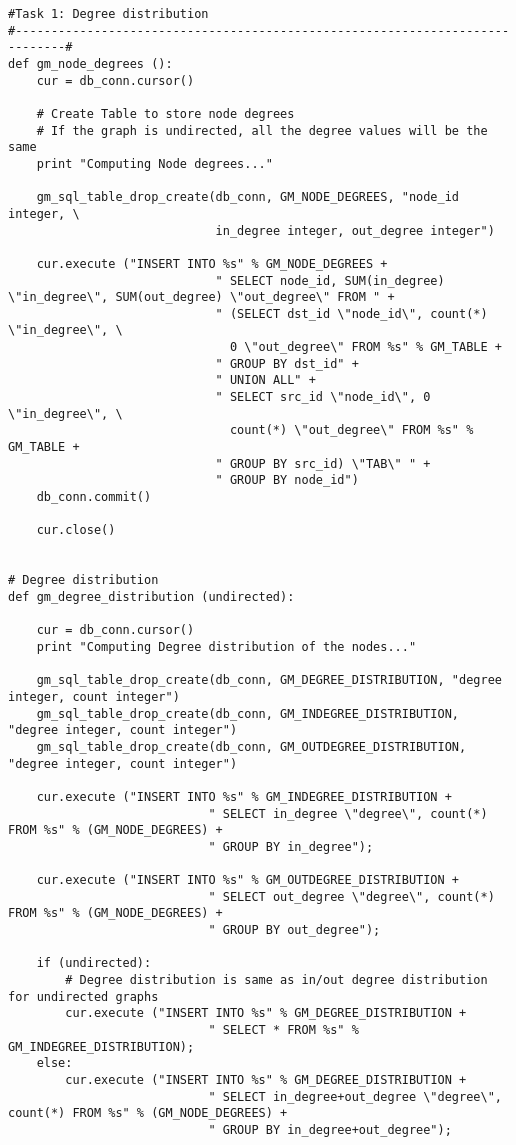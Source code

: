 \documentclass[11pt]{article}
\begin{document}
\begin{lstlisting}
#Task 1: Degree distribution
#-----------------------------------------------------------------------------#
def gm_node_degrees ():
    cur = db_conn.cursor()    
    
    # Create Table to store node degrees
    # If the graph is undirected, all the degree values will be the same
    print "Computing Node degrees..."
    
    gm_sql_table_drop_create(db_conn, GM_NODE_DEGREES, "node_id integer, \
                             in_degree integer, out_degree integer")
    
    cur.execute ("INSERT INTO %s" % GM_NODE_DEGREES +
                             " SELECT node_id, SUM(in_degree) \"in_degree\", SUM(out_degree) \"out_degree\" FROM " +
                             " (SELECT dst_id \"node_id\", count(*) \"in_degree\", \
                               0 \"out_degree\" FROM %s" % GM_TABLE +
                             " GROUP BY dst_id" +
                             " UNION ALL" +
                             " SELECT src_id \"node_id\", 0 \"in_degree\", \
                               count(*) \"out_degree\" FROM %s" % GM_TABLE +
                             " GROUP BY src_id) \"TAB\" " +
                             " GROUP BY node_id")
    db_conn.commit()
                            
    cur.close()

       
# Degree distribution
def gm_degree_distribution (undirected):
    
    cur = db_conn.cursor()
    print "Computing Degree distribution of the nodes..."
    
    gm_sql_table_drop_create(db_conn, GM_DEGREE_DISTRIBUTION, "degree integer, count integer")
    gm_sql_table_drop_create(db_conn, GM_INDEGREE_DISTRIBUTION, "degree integer, count integer")
    gm_sql_table_drop_create(db_conn, GM_OUTDEGREE_DISTRIBUTION, "degree integer, count integer")  
    
    cur.execute ("INSERT INTO %s" % GM_INDEGREE_DISTRIBUTION +
                            " SELECT in_degree \"degree\", count(*) FROM %s" % (GM_NODE_DEGREES) +
                            " GROUP BY in_degree");
                            
    cur.execute ("INSERT INTO %s" % GM_OUTDEGREE_DISTRIBUTION +
                            " SELECT out_degree \"degree\", count(*) FROM %s" % (GM_NODE_DEGREES) +
                            " GROUP BY out_degree");

    if (undirected):
        # Degree distribution is same as in/out degree distribution for undirected graphs
        cur.execute ("INSERT INTO %s" % GM_DEGREE_DISTRIBUTION +
                            " SELECT * FROM %s" % GM_INDEGREE_DISTRIBUTION);
    else:
        cur.execute ("INSERT INTO %s" % GM_DEGREE_DISTRIBUTION +
                            " SELECT in_degree+out_degree \"degree\", count(*) FROM %s" % (GM_NODE_DEGREES) +
                            " GROUP BY in_degree+out_degree");
    

\end{lstlisting}
\end{document}
